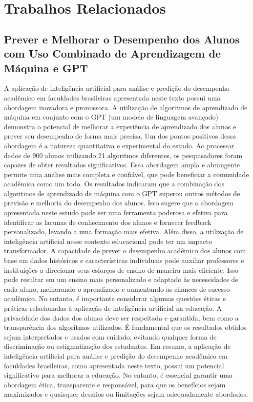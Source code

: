\documentclass[conference]{IEEEtran}
\begin{document}
\section{Trabalhos Relacionados}
\subsection{Prever e Melhorar o Desempenho dos Alunos com Uso Combinado de Aprendizagem de Máquina e GPT\cite{b1}}
A aplicação de inteligência artificial para análise e predição do desempenho acadêmico em faculdades brasileiras apresentada neste texto possui uma abordagem inovadora e promissora. A utilização de algoritmos de aprendizado de máquina em conjunto com o GPT (um modelo de linguagem avançado) demonstra o potencial de melhorar a experiência de aprendizado dos alunos e prever seu desempenho de forma mais precisa.
Um dos pontos positivos dessa abordagem é a natureza quantitativa e experimental do estudo. Ao processar dados de 900 alunos utilizando 21 algoritmos diferentes, os pesquisadores foram capazes de obter resultados significativos. Essa abordagem ampla e abrangente permite uma análise mais completa e confiável, que pode beneficiar a comunidade acadêmica como um todo.
Os resultados indicaram que a combinação dos algoritmos de aprendizado de máquina com o GPT superou outros métodos de previsão e melhoria do desempenho dos alunos. Isso sugere que a abordagem apresentada neste estudo pode ser uma ferramenta poderosa e efetiva para identificar as lacunas de conhecimento dos alunos e fornecer feedback personalizado, levando a uma formação mais efetiva.
Além disso, a utilização de inteligência artificial nesse contexto educacional pode ter um impacto transformador. A capacidade de prever o desempenho acadêmico dos alunos com base em dados históricos e características individuais pode auxiliar professores e instituições a direcionar seus esforços de ensino de maneira mais eficiente. Isso pode resultar em um ensino mais personalizado e adaptado às necessidades de cada aluno, melhorando o aprendizado e aumentando as chances de sucesso acadêmico.
No entanto, é importante considerar algumas questões éticas e práticas relacionadas à aplicação de inteligência artificial na educação. A privacidade dos dados dos alunos deve ser respeitada e garantida, bem como a transparência dos algoritmos utilizados. É fundamental que os resultados obtidos sejam interpretados e usados com cuidado, evitando qualquer forma de discriminação ou estigmatização dos estudantes.
Em resumo, a aplicação de inteligência artificial para análise e predição do desempenho acadêmico em faculdades brasileiras, como apresentada neste texto, possui um potencial significativo para melhorar a educação. No entanto, é essencial garantir uma abordagem ética, transparente e responsável, para que os benefícios sejam maximizados e quaisquer desafios ou limitações sejam adequadamente abordados.
\end{document}
